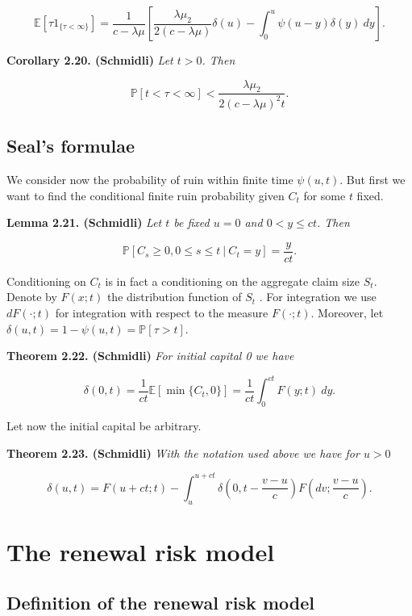\documentclass[a4paper,12pt,openany]{book}
\begin{document}
\[
\mathbb E[\tau 1_{\{\tau<\infty\}}]=\frac{1}{c-\lambda\mu}\left[\frac{\lambda\mu_2}{2(c-\lambda\mu)}\delta(u)-\int_0^u\psi(u-y)\delta(y)\ dy\right].
\]

\textbf{Corollary 2.20. (Schmidli)} \emph{Let \(t>0\). Then}

\[
\mathbb P[t<\tau<\infty]<\frac{\lambda \mu_2}{2(c-\lambda\mu)^2t}.
\]

\hypertarget{seals-formulae}{%
\subsection{Seal's formulae}\label{seals-formulae}}

We consider now the probability of ruin within finite time \(\psi(u, t)\). But first we want to find the conditional finite ruin probability given \(C_t\) for some \(t\) fixed.

\textbf{Lemma 2.21. (Schmidli)} \emph{Let \(t\) be fixed \(u=0\) and \(0< y\le ct\). Then}

\[
\mathbb P[C_s\ge 0,0\le s\le t\ \vert\ C_t=y]=\frac{y}{ct}.
\]

Conditioning on \(C_t\) is in fact a conditioning on the aggregate claim size \(S_t\). Denote by \(F(x; t)\) the distribution function of \(S_t\) . For integration we use \(dF (\cdot; t)\) for integration with respect to the measure \(F (\cdot; t)\). Moreover, let \(\delta(u, t) = 1 − \psi(u, t) = \mathbb P [\tau > t]\).

\textbf{Theorem 2.22. (Schmidli)} \emph{For initial capital 0 we have}

\[
\delta (0,t)=\frac{1}{ct}\mathbb E[\min\{C_t,0\}]=\frac{1}{ct}\int_0^{ct}F(y;t)\ dy.
\]

Let now the initial capital be arbitrary.

\textbf{Theorem 2.23. (Schmidli)} \emph{With the notation used above we have for \(u>0\)}

\[
\delta (u,t)=F(u+ct; t)-\int_u^{u+ct}\delta\left(0,t-\frac{v-u}{c}\right) F\left(dv;\frac{v-u}{c}\right).
\]

\hypertarget{the-renewal-risk-model}{%
\section{The renewal risk model}\label{the-renewal-risk-model}}

\hypertarget{definition-of-the-renewal-risk-model}{%
\subsection{Definition of the renewal risk model}\label{definition-of-the-renewal-risk-model}}
\end{document}
